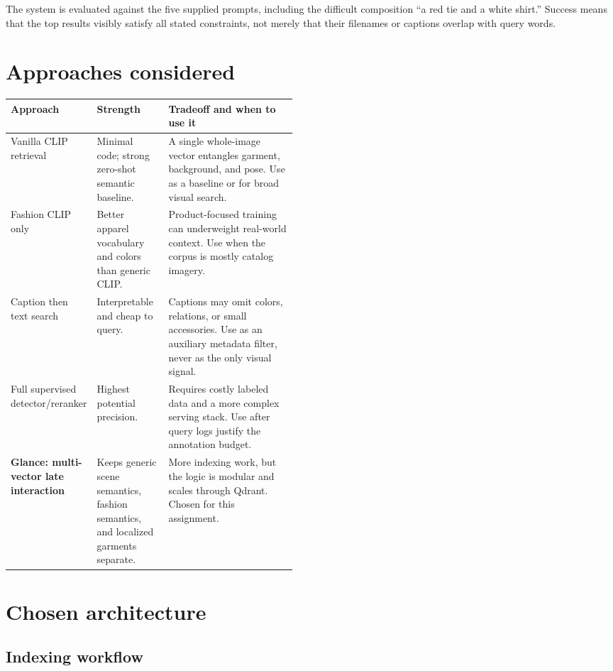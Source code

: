 \documentclass[11pt]{article}
\begin{document}
The system is evaluated against the five supplied prompts, including the difficult composition ``a red tie and a white shirt.'' Success means that the top results visibly satisfy all stated constraints, not merely that their filenames or captions overlap with query words.

\section{Approaches considered}

\begin{tabularx}{\linewidth}{@{}>{\raggedright\arraybackslash}p{0.22\linewidth}>{\raggedright\arraybackslash}p{0.25\linewidth}>{\raggedright\arraybackslash}X@{}}
\toprule
\textbf{Approach} & \textbf{Strength} & \textbf{Tradeoff and when to use it} \\
\midrule
Vanilla CLIP retrieval & Minimal code; strong zero-shot semantic baseline. & A single whole-image vector entangles garment, background, and pose. Use as a baseline or for broad visual search. \\
Fashion CLIP only & Better apparel vocabulary and colors than generic CLIP. & Product-focused training can underweight real-world context. Use when the corpus is mostly catalog imagery. \\
Caption then text search & Interpretable and cheap to query. & Captions may omit colors, relations, or small accessories. Use as an auxiliary metadata filter, never as the only visual signal. \\
Full supervised detector/reranker & Highest potential precision. & Requires costly labeled data and a more complex serving stack. Use after query logs justify the annotation budget. \\
\textbf{Glance: multi-vector late interaction} & Keeps generic scene semantics, fashion semantics, and localized garments separate. & More indexing work, but the logic is modular and scales through Qdrant. Chosen for this assignment. \\
\bottomrule
\end{tabularx}

\section{Chosen architecture}

\subsection{Indexing workflow}
\end{document}
